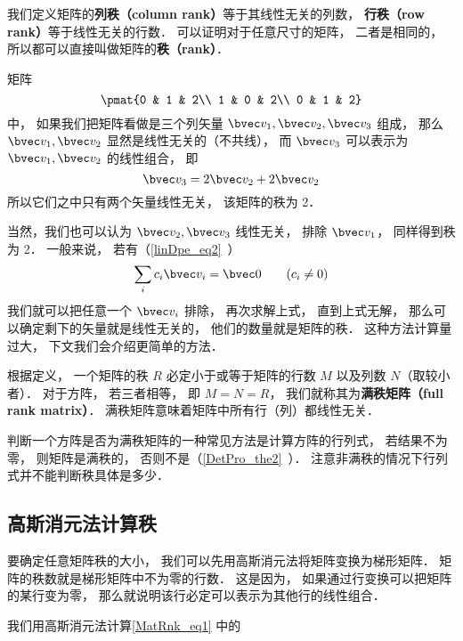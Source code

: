 

我们定义矩阵的\textbf{列秩（column rank）}等于其线性无关的列数， \textbf{行秩（row rank）}等于线性无关的行数． 可以证明对于任意尺寸的矩阵， 二者是相同的， 所以都可以直接叫做矩阵的\textbf{秩（rank）}．

\begin{example}{}
矩阵
\begin{equation}\label{MatRnk_eq1}
\pmat{0 & 1 & 2\\ 1 & 0 & 2\\ 0 & 1 & 2}
\end{equation}
中， 如果我们把矩阵看做是三个列矢量 $\bvec v_1, \bvec v_2, \bvec v_3$ 组成， 那么 $\bvec v_1, \bvec v_2$ 显然是线性无关的（不共线）， 而 $\bvec v_3$ 可以表示为 $\bvec v_1, \bvec v_2$ 的线性组合， 即
\begin{equation}
\bvec v_3 = 2\bvec v_2 + 2\bvec v_2
\end{equation}
所以它们之中只有两个矢量线性无关， 该矩阵的秩为 2．

当然，我们也可以认为 $\bvec v_2, \bvec v_3$ 线性无关， 排除 $\bvec v_1$， 同样得到秩为 2． 一般来说， 若有（\autoref{linDpe_eq2}~）
\begin{equation}
\sum_i c_i \bvec v_i = \bvec 0 \qquad (c_i \ne 0)
\end{equation}
我们就可以把任意一个 $\bvec v_i$ 排除， 再次求解上式， 直到上式无解， 那么可以确定剩下的矢量就是线性无关的， 他们的数量就是矩阵的秩． 这种方法计算量过大， 下文我们会介绍更简单的方法．
\end{example}

根据定义， 一个矩阵的秩 $R$ 必定小于或等于矩阵的行数 $M$ 以及列数 $N$（取较小者）． 对于方阵， 若三者相等， 即 $M = N = R$， 我们就称其为\textbf{满秩矩阵（full rank matrix）}． 满秩矩阵意味着矩阵中所有行（列）都线性无关．

判断一个方阵是否为满秩矩阵的一种常见方法是计算方阵的行列式， 若结果不为零， 则矩阵是满秩的， 否则不是（\autoref{DetPro_the2}~）． 注意非满秩的情况下行列式并不能判断秩具体是多少．


\subsection{高斯消元法计算秩}
要确定任意矩阵秩的大小， 我们可以先用高斯消元法将矩阵变换为梯形矩阵． 矩阵的秩数就是梯形矩阵中不为零的行数． 这是因为， 如果通过行变换可以把矩阵的某行变为零， 那么就说明该行必定可以表示为其他行的线性组合．
\begin{example}{}
我们用高斯消元法计算\autoref{MatRnk_eq1} 中的
\end{example}
